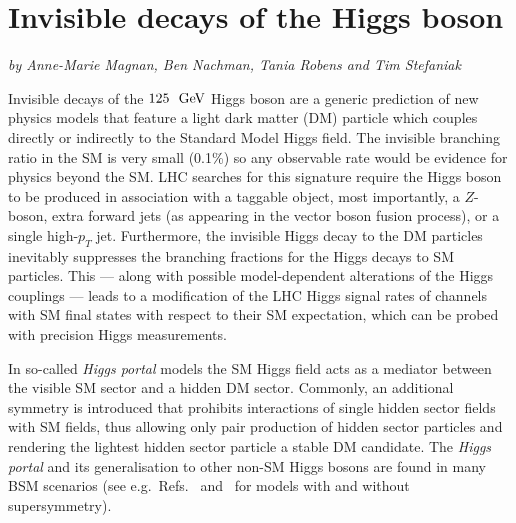\documentclass[../report.tex]{subfiles}
\begin{document}
\section{Invisible decays of the Higgs boson}\label{Sec:6Invisible}

\begin{center}
\textit{by Anne-Marie Magnan, Ben Nachman, Tania Robens and Tim Stefaniak}
\end{center} 

Invisible decays of the $125~\mathrm{~\text{GeV}}$ Higgs boson are a generic prediction of new physics models that feature a light dark matter (DM) particle which couples directly or indirectly to the Standard Model Higgs field. The invisible branching ratio in the SM is very small (0.1\%) so any observable rate would be evidence for physics beyond the SM.  LHC searches for this signature require the Higgs boson to be produced in association with a taggable object, most importantly, a $Z$-boson, extra forward jets (as appearing in the vector boson fusion process), or a single high-$p_T$ jet. Furthermore, the invisible Higgs decay to the DM particles inevitably suppresses the branching fractions for the Higgs decays to SM particles. This --- along with possible model-dependent alterations of the Higgs couplings --- leads to a modification of the LHC Higgs signal rates of channels with SM final states with respect to their SM expectation, which can be probed with precision Higgs measurements. 

In so-called \emph{Higgs portal} models the SM Higgs field acts as a mediator between the visible SM sector and a hidden DM sector. {Commonly,} an additional symmetry {is introduced that} prohibits interactions of single hidden sector fields with SM fields, thus allowing only pair production of hidden sector particles and rendering the lightest hidden sector particle a stable DM candidate. 
The \emph{Higgs portal} and its generalisation to other non-SM Higgs bosons are found in many BSM scenarios (see e.g.~Refs.~\cite{McDonald:2008up,McDonald:2008ua,ArkaniHamed:2006mb,Profumo:2017ntc} and~\cite{Barger:2008jx,Cohen:2011ec,Englert:2011yb,Goudelis:2013uca,Bai:2012nv,Berlin:2015wwa} for models with and without supersymmetry). 
\end{document}

